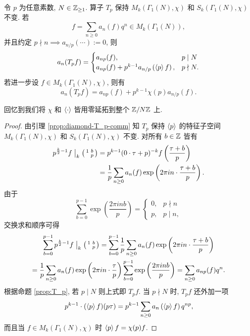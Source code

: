 \begin{theorem}\label{prop:Hecke-Fourier-0}
	令 $p$ 为任意素数, $N \in \mathbb{Z}_{\geq 1}$. 算子 $T_p$ 保持 $M_k(\Gamma_1(N), \chi)$ 和 $S_k(\Gamma_1(N), \chi)$ 不变. 若
	\[ f = \sum_{n\geq 0} a_n(f) q^n \in M_k(\Gamma_1(N)), \]
	并且约定 $p \nmid n \implies a_{n/p}(\cdots) := 0$, 则
	\[ a_n(T_p f) = \begin{cases}
		a_{np}(f), & p \mid N \\
		a_{np}(f) + p^{k-1} a_{n/p} \left(\left\langle p \right\rangle f \right), & p \nmid N.
	\end{cases}\]
	若进一步设 $f \in M_k(\Gamma_1(N), \chi)$, 则有
	\[ a_n(T_p f) = a_{np}(f) + p^{k-1} \chi(p) a_{n/p}(f). \]
\end{theorem}

回忆到我们将 $\chi$ 和 $\left\langle \cdot \right\rangle$ 皆用零延拓到整个 $\mathbb{Z}/N\mathbb{Z}$ 上.
\begin{proof}
	由引理 \ref{prop:diamond-T_p-comm} 知 $T_p$ 保持 $\left\langle p \right\rangle$ 的特征子空间 $M_k(\Gamma_1(N), \chi)$ 和 $S_k(\Gamma_1(N), \chi)$ 不变. 对所有 $b \in \mathbb{Z}$ 皆有
	\begin{align*}
		p^{\frac{k}{2} - 1} f \;\big|_{k} \; \bigl(\begin{smallmatrix} 1 & b \\  & p \end{smallmatrix}\bigr) & = p^{k-1} (0 \cdot \tau + p)^{-k} f\left( \dfrac{\tau + b}{p} \right) \\
		& = \frac{1}{p} \sum_{n \geq 0} a_n(f) \exp\left( 2\pi in \cdot \dfrac{\tau + b}{p} \right).
	\end{align*}
	由于
	\[ \sum_{b=0}^{p-1} \exp\left(\dfrac{2\pi inb}{p}\right) = \begin{cases}
		0, & p \nmid n \\
		p, & p \mid n,
	\end{cases}\]
	交换求和顺序可得
	\begin{multline*}
		\sum_{b=0}^{p-1} p^{\frac{k}{2} - 1} f \;\big|_{k} \; \bigl(\begin{smallmatrix} 1 & b \\  & p \end{smallmatrix}\bigr) = \sum_{b=0}^{p-1} \frac{1}{p} \sum_{n \geq 0} a_n(f) \exp\left( 2\pi in \cdot \dfrac{\tau + b}{p} \right) \\
		= \frac{1}{p} \sum_{n \geq 0} a_n(f) \exp\left( 2\pi in \cdot \frac{\tau}{p} \right) \sum_{b=0}^{p-1} \exp\left(\dfrac{2\pi inb}{p}\right) = \sum_{n \geq 0} a_{np}(f) q^n.
	\end{multline*}
	根据命题 \ref{prop:T_p}, 若 $p \mid N$ 则上式即 $T_p f$. 当 $p \nmid N$ 时, $T_p f$ 还外加一项
	\[ p^{k-1} \cdot (\left\langle p \right\rangle f)(p\tau) = p^{k-1} \sum_{n \geq 0} a_n\left( \left\langle p \right\rangle f \right) q^{np}, \]
	而且当 $f \in M_k(\Gamma_1(N),\chi)$ 时 $\left\langle p \right\rangle f = \chi(p) f$.
\end{proof}

